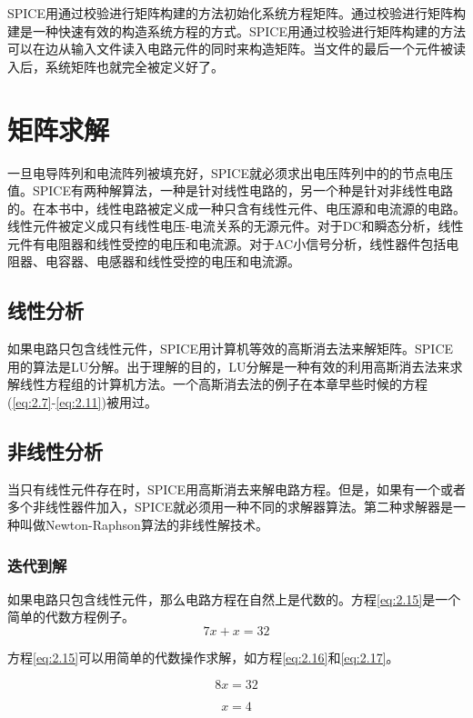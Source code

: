 SPICE用通过校验进行矩阵构建的方法初始化系统方程矩阵。通过校验进行矩阵构建是一种快速有效的构造系统方程的方式。SPICE用通过校验进行矩阵构建的方法可以在边从输入文件读入电路元件的同时来构造矩阵。当文件的最后一个元件被读入后，系统矩阵也就完全被定义好了。

\section{矩阵求解}
一旦电导阵列和电流阵列被填充好，SPICE就必须求出电压阵列中的的节点电压值。SPICE有两种解算法，一种是针对线性电路的，另一个种是针对非线性电路的。在本书中，线性电路被定义成一种只含有线性元件、电压源和电流源的电路。线性元件被定义成只有线性电压-电流关系的无源元件\cite{Hayt1978}。对于DC和瞬态分析，线性元件有电阻器和线性受控的电压和电流源。对于AC小信号分析，线性器件包括电阻器、电容器、电感器和线性受控的电压和电流源。

\subsection{线性分析}
如果电路只包含线性元件，SPICE用计算机等效的高斯消去法来解矩阵。SPICE用的算法是LU分解。出于理解的目的，LU分解是一种有效的利用高斯消去法来求解线性方程组的计算机方法\cite{Vlach1983}。一个高斯消去法的例子在本章早些时候的方程(\ref{eq:2.7}-\ref{eq:2.11})被用过。

\subsection{非线性分析}
当只有线性元件存在时，SPICE用高斯消去来解电路方程。但是，如果有一个或者多个非线性器件加入，SPICE就必须用一种不同的求解器算法。第二种求解器是一种叫做Newton-Raphson算法的非线性解技术。

\subsubsection{迭代到解}
如果电路只包含线性元件，那么电路方程在自然上是代数的。方程\ref{eq:2.15}是一个简单的代数方程例子。
\begin{equation}
    7x + x = 32
    \label{eq:2.15}
\end{equation}

方程\ref{eq:2.15}可以用简单的代数操作求解，如方程\ref{eq:2.16}和\ref{eq:2.17}。

\begin{equation}
    8x = 32
    \label{eq:2.16}
\end{equation}

\begin{equation}
    x = 4
    \label{eq:2.17}
\end{equation}

